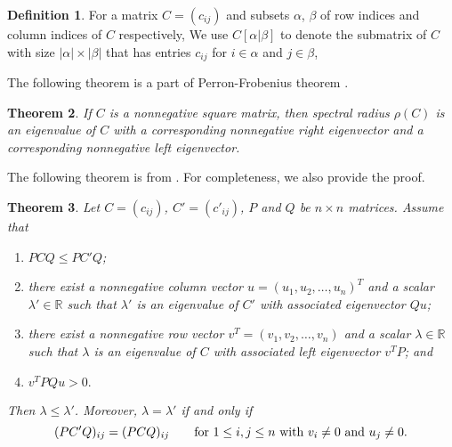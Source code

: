\documentclass[12pt]{report}%
\theoremstyle{plain}
\newtheorem{thm}{Theorem}[chapter]
\theoremstyle{definition}
\newtheorem{defn}[thm]{Definition}
\begin{document}
 
\begin{defn}For a matrix $C=(c_{ij})$ and subsets $\alpha$, $\beta$ of row indices and column indices of $C$ respectively,  We use $C[\alpha|\beta]$ to denote the submatrix of $C$ with size $ |\alpha| \times |\beta| $ that has entries $c_{ij}$ for $i\in \alpha$ and $j\in\beta$,

The following theorem is a part of Perron-Frobenius theorem \cite{'content'}.
\begin{comment}
$C[\alpha|\beta):=C[\alpha|\overline{\beta}],$ where $\overline{\beta}$ is the complement of $\beta$ in the set of column indices, and
similarly, for the definitions of $C(\alpha|\beta]$ and $C(\alpha|\beta).$
 For $\ell\in \mathbb{N},$ $[\ell]:=\{1, 2, \ldots, \ell\},$ symbol $-$ is the complete set of indices, and we use  $i$ to denote the singleton subset $\{i\}$ to reduce the double use of parentheses. For example of the $n\times n$ matrix $C$,
 $C[-|n)=C[[n]|[n-1]]$ is the $n\times (n-1)$ submatrix of $C$ obtained by deleting the last column of $C$.

    The bracket [] and parentheses () can be used together is the notation of sub-matrix, such as $C[k|e)$ or $C(k|e]$.
\end{comment}

\end{defn}

\begin{thm}
        If $C$ is a nonnegative square matrix, then spectral radius $\rho(C)$ is an eigenvalue of $C$ with a corresponding nonnegative right eigenvector and a corresponding nonnegative left eigenvector.
\end{thm}


The following theorem is from \cite{chang}. For completeness, we also provide the proof.

\begin{thm}
 Let $C=(c_{ij})$, $C'=(c'_{ij})$, $P$ and $Q$ be  $n\times n$ matrices.
Assume that
\begin{enumerate}
\item[(i)]    $PCQ\leq PC'Q$;
\item[(ii)]  there exist a nonnegative column vector $u=(u_1, u_2, \ldots, u_n)^T$  and a scalar $\lambda'\in \mathbb{R}$ such that $\lambda'$ is an eigenvalue of $C'$ with associated eigenvector $Qu$;
\item[(iii)] there exist a nonnegative row vector $v^T=(v_1, v_2, \ldots, v_n)$  and a scalar $\lambda\in \mathbb{R}$
such that $\lambda$ is an eigenvalue of $C$ with associated  left eigenvector $v^TP$; and
\item[(iv)] $v^TPQu>0.$
\end{enumerate}
 Then $\lambda\leq \lambda'$.
    Moreover, $\lambda=\lambda'$
if and only if
    \begin{equation}
        \label{pre0}
(PC'Q)_{ij}=(PCQ)_{ij}\qquad \hbox{for~}1\leq i, j\leq n \hbox{~with~} v_i\ne 0 \hbox{~and~} u_j\ne 0.
\end{equation}
\end{thm}
\end{document}
